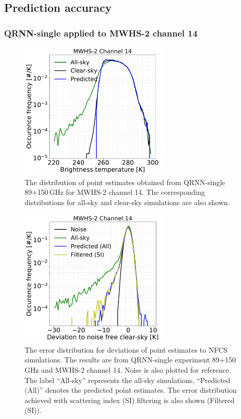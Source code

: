 \documentclass[amt, manuscript]{copernicus}
\begin{document}
\subsection{Prediction accuracy}

\subsubsection{QRNN-single applied to MWHS-2 channel 14} 
\begin{figure}[t]
	\centering
	\includegraphics[width = 70mm]{Figures/fig02.pdf} 
	\caption{The distribution of point estimates obtained from QRNN-single 89+150\,GHz for MWHS-2 channel 14. The corresponding distributions for all-sky and clear-sky simulations are also shown.}
	\label{fig:distribution_predicted_mwhs14}	
\end{figure}
\begin{figure}[t]
	\centering
	\includegraphics[width = 70mm]{Figures/fig03.pdf} 
	\caption{The error distribution for deviations of point estimates to NFCS simulations. The results are from QRNN-single experiment 89+150\,GHz and MWHS-2 channel 14. Noise is also plotted for reference. The label ``All-sky'' represents the all-sky simulations, ``Predicted (All)'' denotes the predicted point estimates. The error distribution achieved with scattering index (SI) filtering is also shown (Filtered (SI)). }
	\label{fig:error_distribution_mwhs14}	
\end{figure}
\end{document}
